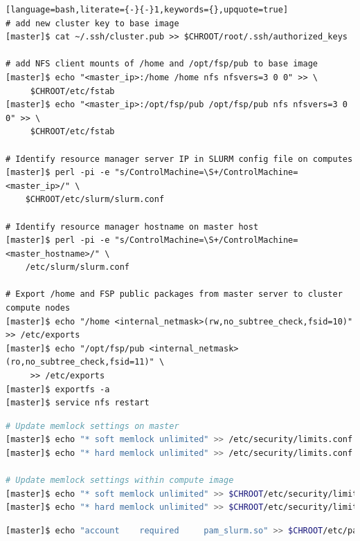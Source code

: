 \documentclass[letterpaper]{article}
\begin{document}
\begin{lstlisting}[language=bash,literate={-}{-}1,keywords={},upquote=true]
# add new cluster key to base image
[master]$ cat ~/.ssh/cluster.pub >> $CHROOT/root/.ssh/authorized_keys

# add NFS client mounts of /home and /opt/fsp/pub to base image
[master]$ echo "<master_ip>:/home /home nfs nfsvers=3 0 0" >> \
     $CHROOT/etc/fstab
[master]$ echo "<master_ip>:/opt/fsp/pub /opt/fsp/pub nfs nfsvers=3 0 0" >> \
     $CHROOT/etc/fstab

# Identify resource manager server IP in SLURM config file on computes
[master]$ perl -pi -e "s/ControlMachine=\S+/ControlMachine=<master_ip>/" \
    $CHROOT/etc/slurm/slurm.conf

# Identify resource manager hostname on master host
[master]$ perl -pi -e "s/ControlMachine=\S+/ControlMachine=<master_hostname>/" \
    /etc/slurm/slurm.conf

# Export /home and FSP public packages from master server to cluster compute nodes
[master]$ echo "/home <internal_netmask>(rw,no_subtree_check,fsid=10)" >> /etc/exports
[master]$ echo "/opt/fsp/pub <internal_netmask>(ro,no_subtree_check,fsid=11)" \
     >> /etc/exports
[master]$ exportfs -a
[master]$ service nfs restart
\end{lstlisting}

 

\begin{lstlisting}[language=bash,keywords={},upquote=true]
# Update memlock settings on master
[master]$ echo "* soft memlock unlimited" >> /etc/security/limits.conf
[master]$ echo "* hard memlock unlimited" >> /etc/security/limits.conf

# Update memlock settings within compute image
[master]$ echo "* soft memlock unlimited" >> $CHROOT/etc/security/limits.conf
[master]$ echo "* hard memlock unlimited" >> $CHROOT/etc/security/limits.conf
\end{lstlisting}



\begin{lstlisting}[language=bash,keywords={},upquote=true]
[master]$ echo "account    required     pam_slurm.so" >> $CHROOT/etc/pam.d/sshd
\end{lstlisting}
\end{document}
